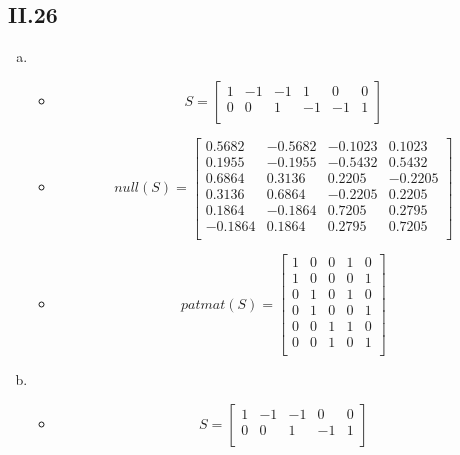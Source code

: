 \documentclass[a4paper, 10pt]{article}
\begin{document}
\subsection*{II.26}
\begin{enumerate}[a)]
  \item \begin{itemize}
          \item \[ S =
            \begin{bmatrix}
            1 & -1 & -1 & 1  & 0  & 0 \\
            0 & 0  & 1  & -1 & -1 & 1 \\
            \end{bmatrix} \]
          \item \[ null(S) = 
            \begin{bmatrix}
            0.5682 & -0.5682 & -0.1023 &  0.1023 \\
            0.1955 & -0.1955 & -0.5432 &  0.5432 \\
            0.6864 &  0.3136 &  0.2205 & -0.2205 \\
            0.3136 &  0.6864 & -0.2205 &  0.2205 \\
            0.1864 & -0.1864 &  0.7205 &  0.2795 \\
           -0.1864 &  0.1864 &  0.2795 &  0.7205 \\
          \end{bmatrix} \]
          \item \[ patmat(S) =
            \begin{bmatrix}
            1 & 0 & 0 & 1 & 0 \\
            1 & 0 & 0 & 0 & 1 \\
            0 & 1 & 0 & 1 & 0 \\
            0 & 1 & 0 & 0 & 1 \\
            0 & 0 & 1 & 1 & 0 \\
            0 & 0 & 1 & 0 & 1 \\
            \end{bmatrix} \]
        \end{itemize}
  \item \begin{itemize}
          \item \[ S =
          \begin{bmatrix}
          1 & -1 & -1 & 0  & 0 \\
          0 & 0  & 1  & -1 & 1 \\
          \end{bmatrix} \]

\end{itemize}
\end{enumerate}
\end{document}
